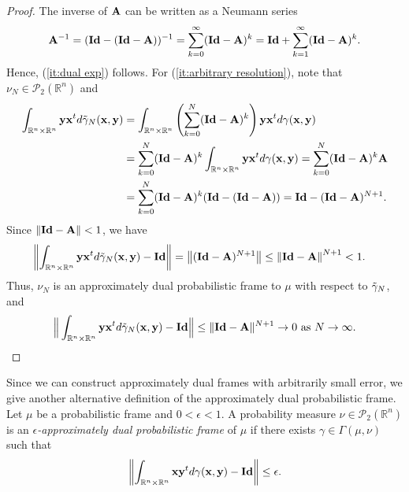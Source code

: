 \documentclass{amsart}
\numberwithin{equation}{section}
\newcommand{\norm}[1]{\left\Vert#1\right\Vert}
\theoremstyle{plain}
\theoremstyle{remark}
\theoremstyle{definition}
\begin{document}
\begin{proof}
The inverse of ${\bf A}$ can be written as a Neumann series
\begin{equation*}
    {{\bf A}^{-1}} = ({\bf Id} - ({\bf Id} - {\bf A}))^{-1} = \sum_{k=0}^{\infty} ({\bf Id} - {\bf A})^k = {\bf Id} + \sum_{k=1}^{\infty} ({\bf Id} - {\bf A})^k.
\end{equation*}
Hence, (\ref{it:dual exp}) follows. For (\ref{it:arbitrary resolution}), note that $\nu_N \in \mathcal{P}_2(\mathbb{R}^n)$ and 
\begin{equation*}
\begin{split}
    \int_{\mathbb{R}^n \times \mathbb{R}^n} {\bf y} {\bf x}^t d\Tilde{\gamma}_N({\bf x, y}) 
    &= \int_{\mathbb{R}^n \times \mathbb{R}^n} \left(\sum\limits_{k=0}^{N} ({\bf Id} - {\bf A})^k \right){\bf y} {\bf x}^t d\gamma({\bf x, y}) \\
    &= \sum\limits_{k=0}^{N} ({\bf Id} - {\bf A})^k \int_{\mathbb{R}^n \times \mathbb{R}^n} {\bf y} {\bf x}^t d\gamma({\bf x, y})= \sum\limits_{k=0}^{N} ({\bf Id} - {\bf A})^k {\bf A} \\
    &= \sum\limits_{k=0}^{N} ({\bf Id} - {\bf A})^k ({\bf Id} -({\bf Id} - {\bf A})) = {\bf Id} - ({\bf Id} -{\bf A})^{N+1}.
\end{split}
\end{equation*}
Since $\| {\bf Id} -{\bf A}  \| < 1$, we have 
 \begin{equation*}
 \begin{split}
      \norm{\int_{\mathbb{R}^n \times \mathbb{R}^n} {\bf y} {\bf x}^t d\Tilde{\gamma}_N({\bf x, y}) - {\bf Id}} &=   \norm{({\bf Id} -{\bf A})^{N+1}}  \leq \norm{{\bf Id} -{\bf A}  }^{N+1} < 1. 
 \end{split}
\end{equation*}
Thus, $ \nu_N$ is an approximately dual probabilistic frame to $\mu$ with respect to $\Tilde{\gamma}_N$, and 
 \begin{equation*}
          \Big \| \int_{\mathbb{R}^n \times \mathbb{R}^n} {\bf y} {\bf x}^t d\Tilde{\gamma}_N({\bf x, y}) - {\bf Id} \Big \|  \leq \| {\bf Id} -{\bf A}  \|^{N+1} \rightarrow 0 \ \text{as $N \rightarrow \infty$}.
\end{equation*}
\end{proof}

Since we can construct approximately dual frames with arbitrarily small error, we give another alternative definition of the approximately dual probabilistic frame. Let $\mu$ be a probabilistic frame and $0<\epsilon<1$. A probability measure $\nu \in \mathcal{P}_2(\mathbb{R}^n)$ is an \emph{$\epsilon$-approximately dual probabilistic frame} of $\mu$ if there exists $\gamma \in \Gamma(\mu, \nu)$ such that
     \begin{equation*}
     \norm{\int_{\mathbb{R}^n \times \mathbb{R}^n} {\bf x}{\bf y}^t d\gamma({\bf x, y}) - {\bf Id}}\leq \epsilon .
\end{equation*}
\end{document}
